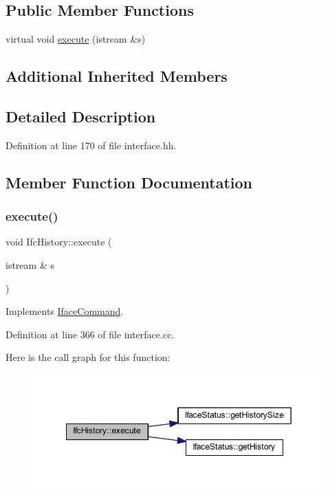 \subsection*{Public Member Functions}
\begin{DoxyCompactItemize}
\item 
virtual void \mbox{\hyperlink{class_ifc_history_a2d0c5037da245a4556030a853789275a}{execute}} (istream \&s)
\end{DoxyCompactItemize}
\subsection*{Additional Inherited Members}


\subsection{Detailed Description}


Definition at line 170 of file interface.\+hh.



\subsection{Member Function Documentation}
\mbox{\label{class_ifc_history_a2d0c5037da245a4556030a853789275a}} 
\subsubsection{\texorpdfstring{execute()}{execute()}}
{\footnotesize\ttfamily void Ifc\+History\+::execute (\begin{DoxyParamCaption}\item[{istream \&}]{s }\end{DoxyParamCaption})\hspace{0.3cm}{\ttfamily [virtual]}}



Implements \mbox{\hyperlink{class_iface_command_af10e29cee2c8e419de6efe9e680ad201}{Iface\+Command}}.



Definition at line 366 of file interface.\+cc.

Here is the call graph for this function\+:
\nopagebreak
\begin{figure}[H]
\begin{center}
\leavevmode
\includegraphics[width=349pt]{class_ifc_history_a2d0c5037da245a4556030a853789275a_cgraph}
\end{center}
\end{figure}


